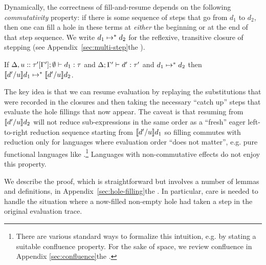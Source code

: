 Dynamically, the correctness of fill-and-resume depends on
the following \emph{commutativity} property: if there is some sequence of
steps that go from $d_1$ to $d_2$, then one can fill a hole in these
terms at \emph{either} the beginning or at the end of that step
sequence.
%
We write $d_1 \mapsto^* d_2$ for the reflexive,
transitive closure of stepping (see \ifarxiv Appendix~\ref{sec:multi-step}\else the \appendixName\fi).
%
\begin{thm}[Commutativity]
  If $\Delta, u :: \tau'[\Gamma']; \emptyset \vdash d_1 : \tau$
  and $\Delta; \Gamma' \vdash d' : \tau'$ and $d_1 \mapsto^* d_2$
  then $\llbracket d' / u\rrbracket d_1 \mapsto^* \llbracket d' / u\rrbracket d_2$.
\end{thm}
%
The key idea is that we can resume evaluation by replaying the substitutions that were recorded in the closures and then taking the necessary ``catch up'' steps that evaluate the hole fillings that now appear.
%
The caveat is that resuming from $\llbracket d' / u\rrbracket d_2$ will not
reduce sub-expressions in the same order as a ``fresh'' eager left-to-right
reduction sequence starting from $\llbracket d' / u\rrbracket d_1$ so 
filling commutes with reduction only for 
languages where evaluation order ``does not matter'', e.g. pure functional languages like \HazelnutLive.\footnote{There are various standard ways to formalize this intuition, e.g. by stating a suitable confluence property. 
For the sake of space, we review confluence in \ifarxiv Appendix \ref{sec:confluence}\else the \appendixName\fi.} Languages with non-commutative effects do not enjoy this property.


We describe the proof, which is straightforward but involves a
number of lemmas and definitions, in \ifarxiv Appendix~\ref{sec:hole-filling}\else the \appendixName\fi.
%
In particular, care is needed to handle the situation where a
now-filled non-empty hole had taken a step in the original evaluation trace.


